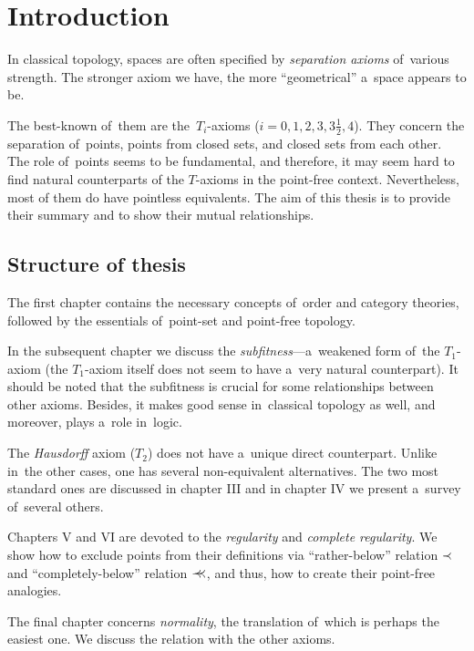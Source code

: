 \chapter*{Introduction}

In classical topology, spaces are often specified by \emph{separation axioms\/}
of~various strength.
The stronger axiom we have, the more ``geometrical'' a~space appears to be.

The best-known of~them are the~$T_i$-axioms ($i = 0, 1, 2, 3, 3\frac{1}{2},
4$).
They concern the separation of~points, points from closed sets, and closed sets
from each other.
The role of~points seems to be fundamental, and therefore, it may seem hard to
find natural counterparts of the $T$-axioms in the point-free context.
Nevertheless, most of them do have pointless equivalents.
The aim of this thesis is to provide their summary and to show their mutual
relationships.

\section*{Structure of thesis}

The first chapter contains the necessary concepts of~order and category
theories, followed by the essentials of~point-set and point-free topology.

In the subsequent chapter we discuss the \emph{subfitness\/}---a~weakened form
of~the $T_1$-axiom (the $T_1$-axiom itself does not seem to have a~very natural
counterpart).
It should be noted that the subfitness is crucial for some relationships
between other axioms.
Besides, it makes good sense in~classical topology as well, and moreover, plays
a~role in~logic.

The \emph{Hausdorff\/} axiom ($T_2$) does not have a~unique direct counterpart.
Unlike in~the other cases, one has several non-equivalent alternatives.
The two most standard ones are discussed in chapter III and in chapter IV we
present a~survey of~several others.

Chapters V and VI are devoted to the \emph{regularity\/} and \emph{complete
regularity\/}.
We show how to exclude points from their definitions via ``rather-below''
relation $\prec$ and ``completely-below'' relation $\prec\mkern-8mu\prec$, and thus, how to create
their point-free analogies.

The final chapter concerns \emph{normality\/}, the translation of~which is
perhaps the easiest one.
We discuss the relation with the other axioms.
